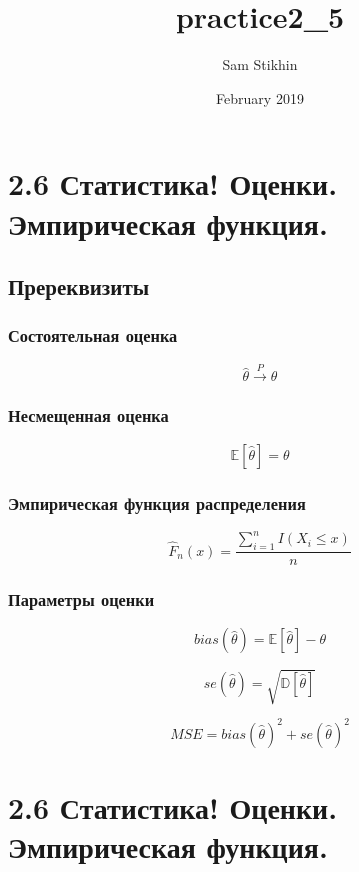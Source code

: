 \documentclass[a4paper, 14pt]{extarticle}
\title{practice2_5}
\author{Sam Stikhin}
\date{February 2019}
\begin{document}
\section*{2.6 Статистика! Оценки. Эмпирическая функция.}
\subsection*{Пререквизиты}
\subsubsection*{Состоятельная оценка}

$$\hat\theta \xrightarrow{P} \theta$$

\subsubsection*{Несмещенная оценка}

$$\mathbb{E}[\hat\theta] = \theta$$


\subsubsection*{Эмпирическая функция распределения}

$$\hat F_{n}(x) = \frac{\sum_{i=1}^{n}I(X_i \leq x)}{n}$$

\subsubsection*{Параметры оценки}

$$bias(\hat\theta) = \mathbb{E}[\hat\theta] - \theta$$

$$se(\hat\theta) = \sqrt{\mathbb{D}[\hat\theta]}$$

$$MSE = bias(\hat\theta)^2 + se(\hat\theta)^2$$
\newpage
\section*{2.6 Статистика! Оценки. Эмпирическая функция.}
\end{document}
